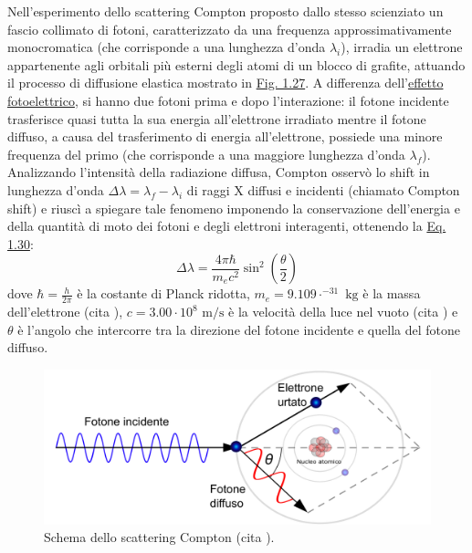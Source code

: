 \documentclass[12pt,a4paper,twoside]{report}
\begin{document}
	Nell'esperimento dello scattering Compton proposto dallo stesso scienziato un fascio collimato di fotoni, caratterizzato da una frequenza approssimativamente monocromatica (che corrisponde a una lunghezza d'onda $\lambda_i$), irradia un elettrone appartenente agli orbitali più esterni degli atomi di un blocco di grafite, attuando il processo di diffusione elastica mostrato in \hyperref[fig:compton]{Fig. 1.27}. A differenza dell'\hyperref[par:effetto_fotoelettrico]{effetto fotoelettrico}, si hanno due fotoni prima e dopo l'interazione: il fotone incidente trasferisce quasi tutta la sua energia all'elettrone irradiato mentre il fotone diffuso, a causa del trasferimento di energia all'elettrone, possiede una minore frequenza del primo (che corrisponde a una maggiore lunghezza d'onda $\lambda_f$). Analizzando l'intensità della radiazione diffusa, Compton osservò lo shift in lunghezza d'onda $\Delta \lambda=\lambda_f-\lambda_i$ di raggi X diffusi e incidenti (chiamato Compton shift) e riuscì a spiegare tale fenomeno imponendo la conservazione dell'energia e della quantità di moto dei fotoni e degli elettroni interagenti, ottenendo la \hyperref[eq:compton]{Eq. 1.30}:
	\begin{equation}
		\Delta \lambda=\frac{4\pi\hbar}{m_ec^2}\sin^2{\left(\frac{\theta}{2}\right)}
		\label{eq:compton}
	\end{equation}
	dove $\hbar=\frac{h}{2\pi}$ è la costante di Planck ridotta, $m_e=9.109\cdot^{-31}\mbox{ kg}$ è la massa dell'elettrone (cita
	), $c=3.00\cdot10^{8}\mbox{ m/s}$ è la velocità della luce nel vuoto (cita
	) e $\theta$ è l'angolo che intercorre tra la direzione del fotone incidente e quella del fotone diffuso.
	
	\begin{figure}[H]
		\centering
		\includegraphics[width=0.9\linewidth]{compton.pdf}
		\caption{Schema dello scattering Compton (cita
			).}
		\label{fig:compton}
	\end{figure}
	
\end{document}
